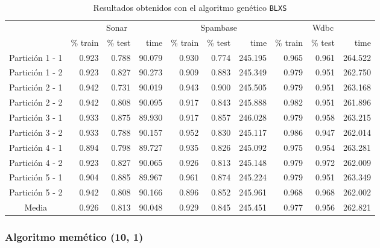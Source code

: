 \documentclass[11pt]{article}
\theoremstyle{plain}
\theoremstyle{definition}
\begin{document}
\begin{table}[H]
\centering
\caption{Resultados obtenidos con el algoritmo genético \texttt{BLXS}}
\label{tbl-blxs}
\begin{tabular}{@{}crrrrrrrrr@{}}
  \toprule
  & \multicolumn{3}{c}{Sonar} & \multicolumn{3}{c}{Spambase} & \multicolumn{3}{c}{Wdbc}  \\
  \cmidrule(r){2-10}
           & \% train & \% test & time & \% train   & \% test   & time & \% train & \% test & time \\
  \midrule
Partición 1 - 1      & 0.923 & 0.788 & 90.079 & 0.930 & 0.774 & 245.195 & 0.965 & 0.961 & 264.522 \\
Partición 1 - 2      & 0.923 & 0.827 & 90.273 & 0.909 & 0.883 & 245.349 & 0.979 & 0.951 & 262.750 \\
Partición 2 - 1      & 0.942 & 0.731 & 90.019 & 0.943 & 0.900 & 245.505 & 0.979 & 0.951 & 263.168 \\
Partición 2 - 2      & 0.942 & 0.808 & 90.095 & 0.917 & 0.843 & 245.888 & 0.982 & 0.951 & 261.896 \\
Partición 3 - 1      & 0.933 & 0.875 & 89.930 & 0.917 & 0.857 & 246.028 & 0.979 & 0.958 & 263.215 \\
Partición 3 - 2      & 0.933 & 0.788 & 90.157 & 0.952 & 0.830 & 245.117 & 0.986 & 0.947 & 262.014 \\
Partición 4 - 1      & 0.894 & 0.798 & 89.727 & 0.935 & 0.826 & 245.092 & 0.975 & 0.954 & 263.281 \\
Partición 4 - 2      & 0.923 & 0.827 & 90.065 & 0.926 & 0.813 & 245.148 & 0.979 & 0.972 & 262.009 \\
Partición 5 - 1      & 0.904 & 0.885 & 89.967 & 0.961 & 0.874 & 245.224 & 0.979 & 0.951 & 263.349 \\
Partición 5 - 2      & 0.942 & 0.808 & 90.166 & 0.896 & 0.852 & 245.961 & 0.968 & 0.968 & 262.002 \\
  \bottomrule
Media                & 0.926 & 0.813 & 90.048 & 0.929 & 0.845 & 245.451 & 0.977 & 0.956 & 262.821 \\
\end{tabular}
\end{table}

\subsubsection{Algoritmo memético (10, 1)}
\end{document}
